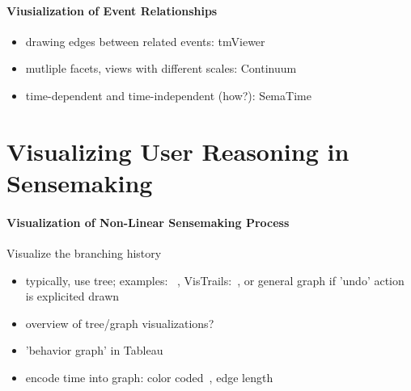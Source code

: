\paragraph{Viusialization of Event Relationships}
\begin{itemize}
	\item drawing edges between related events: tmViewer~\cite{Kumar1998}
	\item mutliple facets, views with different scales: Continuum~\cite{Andre2007}
	\item time-dependent and time-independent (how?): SemaTime~\cite{Stab2010}
\end{itemize}
%

\section{Visualizing User Reasoning in Sensemaking}
\paragraph{Visualization of Non-Linear Sensemaking Process}
Visualize the branching history
\begin{itemize}
	\item typically, use tree; examples: ~\cite{Jankun-Kelly2007}, VisTrails:~\cite{Bavoil2005}, or general graph if 'undo' action is explicited drawn
	\item overview of tree/graph visualizations?
	\item 'behavior graph' in Tableau
	\item encode time into graph: color coded~\cite{Bavoil2005}, edge length~\cite{Shrinivasan2008}
\end{itemize}

